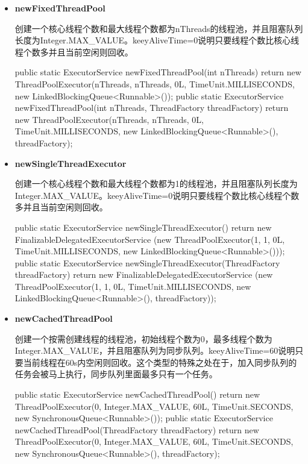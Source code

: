 \begin{itemize}
    \item \textbf{newFixedThreadPool}
    
    创建一个核心线程个数和最大线程个数都为nThreads的线程池，并且阻塞队列长度为Integer.MAX\_VALUE。keeyAliveTime=0说明只要线程个数比核心线程个数多并且当前空闲则回收。

\begin{Java}
public static ExecutorService newFixedThreadPool(int nThreads) {
    return new ThreadPoolExecutor(nThreads, nThreads, 0L, TimeUnit.MILLISECONDS, new LinkedBlockingQueue<Runnable>());
}
public static ExecutorService newFixedThreadPool(int nThreads, ThreadFactory threadFactory) {
    return new ThreadPoolExecutor(nThreads, nThreads, 0L, TimeUnit.MILLISECONDS, new LinkedBlockingQueue<Runnable>(), threadFactory);
}
\end{Java}

    \item \textbf{newSingleThreadExecutor}
    
    创建一个核心线程个数和最大线程个数都为1的线程池，并且阻塞队列长度为Integer.MAX\_VALUE。keeyAliveTime=0说明只要线程个数比核心线程个数多并且当前空闲则回收。

\begin{Java}
public static ExecutorService newSingleThreadExecutor() {
    return new FinalizableDelegatedExecutorService
        (new ThreadPoolExecutor(1, 1, 0L, TimeUnit.MILLISECONDS, new LinkedBlockingQueue<Runnable>()));
}
public static ExecutorService newSingleThreadExecutor(ThreadFactory threadFactory) {
    return new FinalizableDelegatedExecutorService
        (new ThreadPoolExecutor(1, 1, 0L, TimeUnit.MILLISECONDS, new LinkedBlockingQueue<Runnable>(), threadFactory));
}
\end{Java}

    \item \textbf{newCachedThreadPool}

    创建一个按需创建线程的线程池，初始线程个数为0，最多线程个数为Integer.MAX\_VALUE，并且阻塞队列为同步队列。keeyAliveTime=60说明只要当前线程在60s内空闲则回收。这个类型的特殊之处在于，加入同步队列的任务会被马上执行，同步队列里面最多只有一个任务。

\begin{Java}
public static ExecutorService newCachedThreadPool() {
    return new ThreadPoolExecutor(0, Integer.MAX_VALUE, 60L, TimeUnit.SECONDS, new SynchronousQueue<Runnable>());
}
public static ExecutorService newCachedThreadPool(ThreadFactory threadFactory) {
    return new ThreadPoolExecutor(0, Integer.MAX_VALUE, 60L, TimeUnit.SECONDS, new SynchronousQueue<Runnable>(), threadFactory);
}
\end{Java}
\end{itemize}

